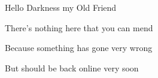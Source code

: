 \begin{center}
Hello Darkness my Old Friend

There's nothing here that you can mend

Because something has gone very wrong

But should be back online very soon
\end{center}
